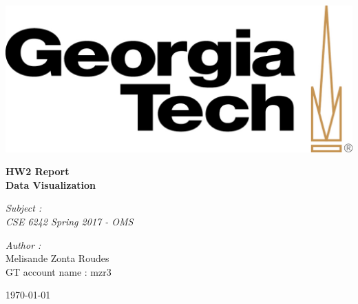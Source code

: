 \documentclass{article}
\begin{document}

\graphicspath{{/Users/jacquelineroudes/Documents/GTL_courses/Data_Visual_Analytics/Assignments/Homework2}}
\begin{titlepage}

\begin{center}
\includegraphics[scale=0.4]{GT_logo.jpeg}
\end{center}
\hrulefill
\begin{center}\bfseries\huge
   HW2 Report \\
    Data Visualization\\
    \hrulefill
\end{center}
\vspace*{1cm}
\begin{minipage}[t]{0.4\textwidth}
  \begin{flushleft} \large
    \emph{Subject : \\
    CSE 6242 Spring 2017 - OMS}\\
  \end{flushleft}
\end{minipage}
\begin{minipage}[t]{0.6\textwidth}
  \begin{flushright} \large
    \emph{Author :} \\
    Melisande Zonta Roudes \\
    GT account name : mzr3 \\
  \end{flushright}
\end{minipage}
\begin{flushright}
        \today 
\end{flushright} 

\end{titlepage}
\end{document}

